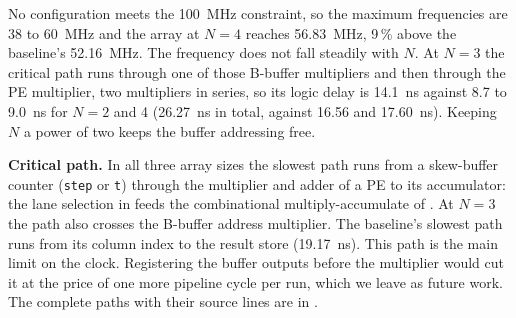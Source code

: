 No configuration meets the 100~MHz constraint, so the maximum frequencies are 38 to 60~MHz and the array at $N = 4$ reaches 56.83~MHz, 9\,\% above the baseline's 52.16~MHz. The frequency does not fall steadily with $N$. At $N = 3$ the critical path runs through one of those B-buffer multipliers and then through the PE multiplier, two multipliers in series, so its logic delay is 14.1~ns against 8.7 to 9.0~ns for $N = 2$ and 4 (26.27~ns in total, against 16.56 and 17.60~ns). Keeping $N$ a power of two keeps the buffer addressing free.

\textbf{Critical path.} In all three array sizes the slowest path runs from a skew-buffer counter (\texttt{step} or \texttt{t}) through the multiplier and adder of a PE to its accumulator: the lane selection in  feeds the combinational multiply-accumulate of . At $N = 3$ the path also crosses the B-buffer address multiplier. The baseline's slowest path runs from its column index to the result store (19.17~ns). This path is the main limit on the clock. Registering the buffer outputs before the multiplier would cut it at the price of one more pipeline cycle per run, which we leave as future work. The complete paths with their source lines are in .
